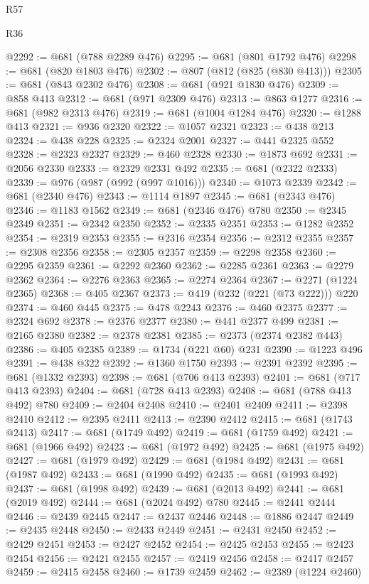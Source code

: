 \begin{lexlean}{R57}
\begin{lexlean}{R36}
\begin{coremodule}
{{{{{{{{{{{{{{{{{{{{{{{{{{{{{{{{{{{{{{{{{{{{{{{{{{{{{{{{{{{{{{{{{{{{{{{{{{{{{{{{{{@2292 := @681 (@788 @2289 @476)
@2295 := @681 (@801 @1792 @476)
@2298 := @681 (@820 @1803 @476)
@2302 := @807 (@812 (@825 (@830 @413)))
@2305 := @681 (@843 @2302 @476)
@2308 := @681 (@921 @1830 @476)
@2309 := @858 @413
@2312 := @681 (@971 @2309 @476)
@2313 := @863 @1277
@2316 := @681 (@982 @2313 @476)
@2319 := @681 (@1004 @1284 @476)
@2320 := @1288 @413
@2321 := @936 @2320
@2322 := @1057 @2321
@2323 := @438 @213
@2324 := @438 @228
@2325 := @2324 @2001
@2327 := @441 @2325 @552
@2328 := @2323 @2327
@2329 := @460 @2328
@2330 := @1873 @692
@2331 := @2056 @2330
@2333 := @2329 @2331 @492
@2335 := @681 (@2322 @2333)
@2339 := @976 (@987 (@992 (@997 @1016)))
@2340 := @1073 @2339
@2342 := @681 (@2340 @476)
@2343 := @1114 @1897
@2345 := @681 (@2343 @476)
@2346 := @1183 @1562
@2349 := @681 (@2346 @476) @780
@2350 := @2345 @2349
@2351 := @2342 @2350
@2352 := @2335 @2351
@2353 := @1282 @2352
@2354 := @2319 @2353
@2355 := @2316 @2354
@2356 := @2312 @2355
@2357 := @2308 @2356
@2358 := @2305 @2357
@2359 := @2298 @2358
@2360 := @2295 @2359
@2361 := @2292 @2360
@2362 := @2285 @2361
@2363 := @2279 @2362
@2364 := @2276 @2363
@2365 := @2274 @2364
@2367 := @2271 (@1224 @2365)
@2368 := @405 @2367
@2373 := @419 (@232 (@221 (@73 @222))) @220
@2374 := @460 @445
@2375 := @478 @2243
@2376 := @460 @2375
@2377 := @2324 @692
@2378 := @2376 @2377
@2380 := @441 @2377 @499
@2381 := @2165 @2380
@2382 := @2378 @2381
@2385 := @2373 (@2374 @2382 @443)
@2386 := @405 @2385
@2389 := @1734 (@221 @60) @231
@2390 := @1223 @496
@2391 := @438 @322
@2392 := @1360 @1750
@2393 := @2391 @2392
@2395 := @681 (@1332 @2393)
@2398 := @681 (@706 @413 @2393)
@2401 := @681 (@717 @413 @2393)
@2404 := @681 (@728 @413 @2393)
@2408 := @681 (@788 @413 @492) @780
@2409 := @2404 @2408
@2410 := @2401 @2409
@2411 := @2398 @2410
@2412 := @2395 @2411
@2413 := @2390 @2412
@2415 := @681 (@1743 @2413)
@2417 := @681 (@1749 @492)
@2419 := @681 (@1759 @492)
@2421 := @681 (@1966 @492)
@2423 := @681 (@1972 @492)
@2425 := @681 (@1975 @492)
@2427 := @681 (@1979 @492)
@2429 := @681 (@1984 @492)
@2431 := @681 (@1987 @492)
@2433 := @681 (@1990 @492)
@2435 := @681 (@1993 @492)
@2437 := @681 (@1998 @492)
@2439 := @681 (@2013 @492)
@2441 := @681 (@2019 @492)
@2444 := @681 (@2024 @492) @780
@2445 := @2441 @2444
@2446 := @2439 @2445
@2447 := @2437 @2446
@2448 := @1886 @2447
@2449 := @2435 @2448
@2450 := @2433 @2449
@2451 := @2431 @2450
@2452 := @2429 @2451
@2453 := @2427 @2452
@2454 := @2425 @2453
@2455 := @2423 @2454
@2456 := @2421 @2455
@2457 := @2419 @2456
@2458 := @2417 @2457
@2459 := @2415 @2458
@2460 := @1739 @2459
@2462 := @2389 (@1224 @2460)
}}}}}}}}}}}}}}}}}}}}}}}}}}}}}}}}}}}}}}}}}}}}}}}}}}}}}}}}}}}}}}}}}}}}}}}}}}}}}}}}}}
\end{coremodule}
\end{lexlean}
\end{lexlean}
